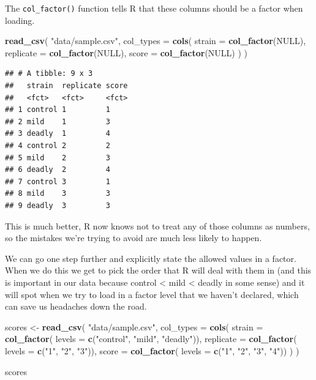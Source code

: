 \documentclass[
]{book}
\newenvironment{Shaded}{\begin{snugshade}}{\end{snugshade}}
\newcommand{\DataTypeTok}[1]{\textcolor[rgb]{0.13,0.29,0.53}{#1}}
\newcommand{\KeywordTok}[1]{\textcolor[rgb]{0.13,0.29,0.53}{\textbf{#1}}}
\newcommand{\NormalTok}[1]{#1}
\newcommand{\OtherTok}[1]{\textcolor[rgb]{0.56,0.35,0.01}{#1}}
\newcommand{\StringTok}[1]{\textcolor[rgb]{0.31,0.60,0.02}{#1}}
\begin{document}
The \texttt{col\_factor()} function tells R that these columns should be a factor when loading.

\begin{Shaded}
\begin{Highlighting}[]
\KeywordTok{read_csv}\NormalTok{(}
  \StringTok{"data/sample.csv"}\NormalTok{,}
  \DataTypeTok{col_types =} \KeywordTok{cols}\NormalTok{(}
    \DataTypeTok{strain =} \KeywordTok{col_factor}\NormalTok{(}\OtherTok{NULL}\NormalTok{),}
    \DataTypeTok{replicate =} \KeywordTok{col_factor}\NormalTok{(}\OtherTok{NULL}\NormalTok{),}
    \DataTypeTok{score =} \KeywordTok{col_factor}\NormalTok{(}\OtherTok{NULL}\NormalTok{)}
\NormalTok{  )}
\NormalTok{)}
\end{Highlighting}
\end{Shaded}

\begin{verbatim}
## # A tibble: 9 x 3
##   strain  replicate score
##   <fct>   <fct>     <fct>
## 1 control 1         1    
## 2 mild    1         3    
## 3 deadly  1         4    
## 4 control 2         2    
## 5 mild    2         3    
## 6 deadly  2         4    
## 7 control 3         1    
## 8 mild    3         3    
## 9 deadly  3         3
\end{verbatim}

This is much better, R now knows not to treat any of those columns as numbers, so the mistakes we're trying to avoid are much less likely to happen.

We can go one step further and explicitly state the allowed values in a factor. When we do this we get to pick the order that R will deal with them in (and this is important in our data because control \textless{} mild \textless{} deadly in some sense) and it will spot when we try to load in a factor level that we haven't declared, which can save us headaches down the road.

\begin{Shaded}
\begin{Highlighting}[]
\NormalTok{scores <-}\StringTok{ }\KeywordTok{read_csv}\NormalTok{(}
  \StringTok{"data/sample.csv"}\NormalTok{,}
  \DataTypeTok{col_types =} \KeywordTok{cols}\NormalTok{(}
    \DataTypeTok{strain =} \KeywordTok{col_factor}\NormalTok{( }\DataTypeTok{levels =} \KeywordTok{c}\NormalTok{(}\StringTok{"control"}\NormalTok{, }\StringTok{"mild"}\NormalTok{, }\StringTok{"deadly"}\NormalTok{)),}
    \DataTypeTok{replicate =} \KeywordTok{col_factor}\NormalTok{( }\DataTypeTok{levels =} \KeywordTok{c}\NormalTok{(}\StringTok{"1"}\NormalTok{, }\StringTok{"2"}\NormalTok{, }\StringTok{"3"}\NormalTok{)),}
    \DataTypeTok{score =} \KeywordTok{col_factor}\NormalTok{( }\DataTypeTok{levels =} \KeywordTok{c}\NormalTok{(}\StringTok{"1"}\NormalTok{, }\StringTok{"2"}\NormalTok{, }\StringTok{"3"}\NormalTok{, }\StringTok{"4"}\NormalTok{))}
\NormalTok{  )}
\NormalTok{)}

\NormalTok{scores}
\end{Highlighting}
\end{Shaded}
\end{document}
